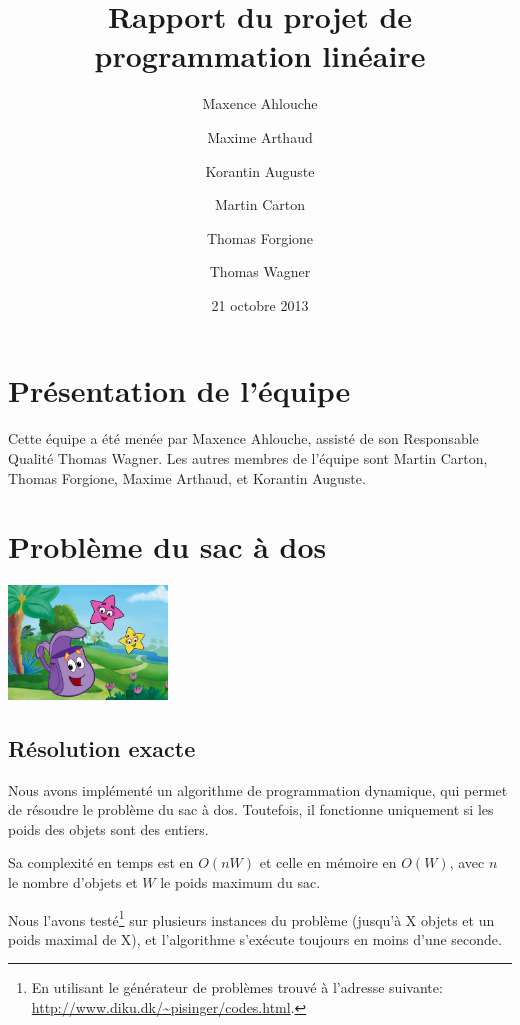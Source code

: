 \documentclass{scrartcl}
\begin{document}
\title{Rapport du projet de programmation linéaire}
\author{Maxence Ahlouche \and Maxime Arthaud \and Korantin Auguste
          \and Martin Carton \and Thomas Forgione \and Thomas Wagner}
\date{21 octobre 2013}
\maketitle
\tableofcontents
\newpage

\section{Présentation de l'équipe}
  Cette équipe a été menée par Maxence Ahlouche, assisté de son Responsable
  Qualité Thomas Wagner. Les autres membres de l'équipe sont Martin Carton,
  Thomas Forgione, Maxime Arthaud, et Korantin Auguste.

  
\section{Problème du sac à dos}
  \begin{center}\includegraphics[width=120pt]{sac_a_dos.jpg}\end{center}

  \subsection{Résolution exacte}
    Nous avons implémenté un algorithme de programmation dynamique, qui permet
    de résoudre le problème du sac à dos.  Toutefois, il fonctionne uniquement
    si les poids des objets sont des entiers.

    Sa complexité en temps est en $O(nW)$ et celle en mémoire en $O(W)$, avec
    $n$ le nombre d'objets et $W$ le poids maximum du sac.

    Nous l'avons testé\footnote{En utilisant le générateur de problèmes trouvé
    à l'adresse suivante: \url{http://www.diku.dk/~pisinger/codes.html}.} sur
    plusieurs instances du problème (jusqu'à X objets et un poids maximal de
    X), et l'algorithme s'exécute toujours en moins d'une seconde.
\end{document}
